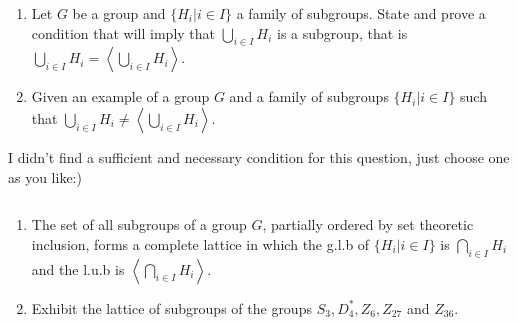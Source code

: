 $$ $$

\begin{ex}
    \begin{enumerate}
        \item Let $G$ be a group and $\{H_i| i\in I\}$ a family of subgroups. State and prove a condition that will imply that $\bigcup\limits_{i\in I}H_i$ is a subgroup, that is $\bigcup\limits_{i\in I}H_i = \left\langle\bigcup\limits_{i\in I}H_i\right\rangle$.
        \item Given an example of a group $G$ and a family of subgroups $\{H_i|i \in I\}$ such that $\bigcup\limits_{i\in I}H_i \neq \left\langle\bigcup\limits_{i\in I}H_i\right\rangle$.
    \end{enumerate}
\end{ex}

\begin{answer}
    I didn't find a sufficient and necessary condition for this question, just choose one as you like:)
\end{answer}

$$ $$

\begin{ex}
    \begin{enumerate}
        \item The set of all subgroups of a group $G$, partially ordered by set theoretic inclusion, forms a complete lattice in which the g.l.b of $\{H_i|i\in I\}$ is $\bigcap\limits_{i\in I}H_i$ and the l.u.b is $\left\langle\bigcap\limits_{i\in I}H_i\right\rangle$.
        \item Exhibit the lattice of subgroups of the groups $S_3, D_4^*, Z_6, Z_{27}$ and $Z_{36}$.
    \end{enumerate}
\end{ex}

